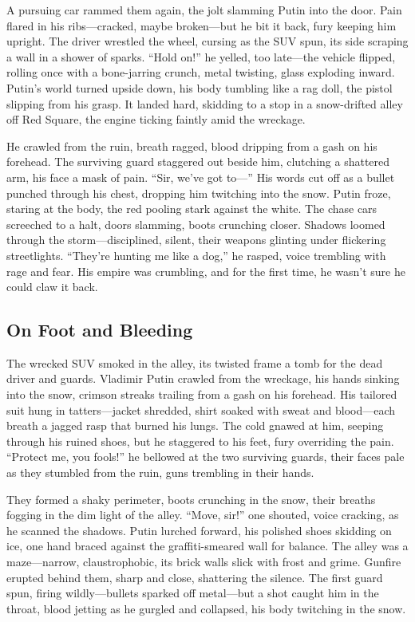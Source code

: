 \documentclass[12pt]{book}
\begin{document}
A pursuing car rammed them again, the jolt slamming Putin into the door. Pain flared in his ribs—cracked, maybe broken—but he bit it back, fury keeping him upright. The driver wrestled the wheel, cursing as the SUV spun, its side scraping a wall in a shower of sparks. “Hold on!” he yelled, too late—the vehicle flipped, rolling once with a bone-jarring crunch, metal twisting, glass exploding inward. Putin’s world turned upside down, his body tumbling like a rag doll, the pistol slipping from his grasp. It landed hard, skidding to a stop in a snow-drifted alley off Red Square, the engine ticking faintly amid the wreckage.

He crawled from the ruin, breath ragged, blood dripping from a gash on his forehead. The surviving guard staggered out beside him, clutching a shattered arm, his face a mask of pain. “Sir, we’ve got to—” His words cut off as a bullet punched through his chest, dropping him twitching into the snow. Putin froze, staring at the body, the red pooling stark against the white. The chase cars screeched to a halt, doors slamming, boots crunching closer. Shadows loomed through the storm—disciplined, silent, their weapons glinting under flickering streetlights. “They’re hunting me like a dog,” he rasped, voice trembling with rage and fear. His empire was crumbling, and for the first time, he wasn’t sure he could claw it back.

\subsection{On Foot and Bleeding}

The wrecked SUV smoked in the alley, its twisted frame a tomb for the dead driver and guards. Vladimir Putin crawled from the wreckage, his hands sinking into the snow, crimson streaks trailing from a gash on his forehead. His tailored suit hung in tatters—jacket shredded, shirt soaked with sweat and blood—each breath a jagged rasp that burned his lungs. The cold gnawed at him, seeping through his ruined shoes, but he staggered to his feet, fury overriding the pain. “Protect me, you fools!” he bellowed at the two surviving guards, their faces pale as they stumbled from the ruin, guns trembling in their hands.

They formed a shaky perimeter, boots crunching in the snow, their breaths fogging in the dim light of the alley. “Move, sir!” one shouted, voice cracking, as he scanned the shadows. Putin lurched forward, his polished shoes skidding on ice, one hand braced against the graffiti-smeared wall for balance. The alley was a maze—narrow, claustrophobic, its brick walls slick with frost and grime. Gunfire erupted behind them, sharp and close, shattering the silence. The first guard spun, firing wildly—bullets sparked off metal—but a shot caught him in the throat, blood jetting as he gurgled and collapsed, his body twitching in the snow.
\end{document}
